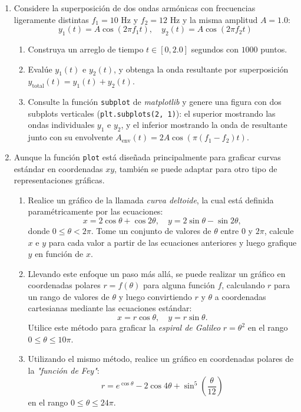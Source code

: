 \documentclass[12pt]{article}
\begin{document}
\begin{problemas}[]
\begin{enumerate}[leftmargin=*]
    \item Considere la superposición de dos ondas armónicas con frecuencias ligeramente distintas $f_1 = 10\text{ Hz}$ y $f_2 = 12\text{ Hz}$ y la misma amplitud $A = 1.0$:
    $$y_1(t) = A \cos(2\pi f_1 t), \quad y_2(t) = A \cos(2\pi f_2 t)$$
    
    \begin{enumerate}[label=\alph*)]
        \item Construya un arreglo de tiempo $t \in [0, 2.0]$ segundos con $1000$ puntos.
        \item Evalúe $y_1(t)$ e $y_2(t)$, y obtenga la onda resultante por superposición $y_{\text{total}}(t) = y_1(t) + y_2(t)$.
        \item Consulte la función \lstinline|subplot| de 
        \textit{matplotlib} y genere una figura con dos subplots 
        verticales (\lstinline|plt.subplots(2, 1)|): el superior mostrando las 
        ondas individuales $y_1$ e $y_2$, y el inferior mostrando la onda de 
        resultante junto con su envolvente $A_{\text{env}}(t) = 2A \cos(\pi(f_1 - f_2)t)$.
    \end{enumerate}

    \item Aunque la función \lstinline|plot| está diseñada principalmente para graficar curvas estándar en coordenadas $xy$, también se puede adaptar para otro tipo de representaciones gráficas.

\begin{enumerate}[label=\alph*)]
    \item Realice un gráfico de la llamada \textit{curva deltoide}, la cual está definida paramétricamente por las ecuaciones:
    \[
    x = 2\cos\theta + \cos 2\theta, \quad y = 2\sin\theta - \sin 2\theta,
    \]
    donde $0 \le \theta < 2\pi$. Tome un conjunto de valores de $\theta$ entre $0$ y $2\pi$, calcule $x$ e $y$ para cada valor a partir de las ecuaciones anteriores y luego grafique $y$ en función de $x$.

    \item Llevando este enfoque un paso más allá, se puede realizar un gráfico en coordenadas polares $r = f(\theta)$ para alguna función $f$, calculando $r$ para un rango de valores de $\theta$ y luego convirtiendo $r$ y $\theta$ a coordenadas cartesianas mediante las ecuaciones estándar:
    \[
    x = r \cos\theta, \quad y = r \sin\theta.
    \]
    Utilice este método para graficar la \textit{espiral de Galileo} $r = \theta^2$ en el rango $0 \le \theta \le 10\pi$.

    \item Utilizando el mismo método, realice un gráfico en coordenadas polares de la \textit{"función de Fey"}:
    \[
    r = e^{\cos\theta} - 2\cos 4\theta + \sin^5\left(\frac{\theta}{12}\right)
    \]
    en el rango $0 \le \theta \le 24\pi$.
\end{enumerate}
\end{enumerate}
\end{problemas}

\label{LastPage}
\end{document}
